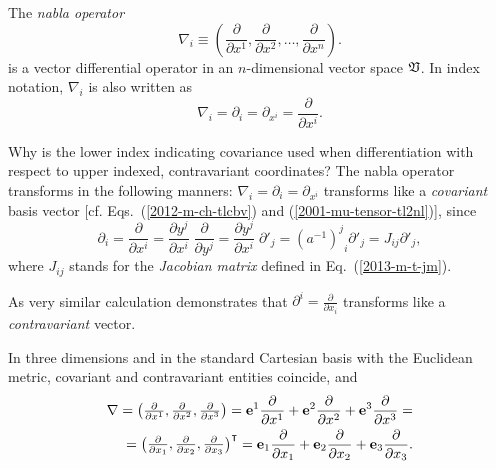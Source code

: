 The {\em nabla operator}
\begin{equation}
\nabla_i \equiv \left(
\frac{\partial }{\partial x^1},
\frac{\partial }{\partial x^2},
\ldots ,
\frac{\partial }{\partial x^n}
\right).
\end{equation}
is a vector differential operator in an $n$-dimensional vector space $\frak V$.
In index notation, $\nabla_i$ is also written as
\begin{equation}
\nabla_i  =\partial_i =\partial_{x^i}
= \frac{\partial }{\partial x^i}
.
\end{equation}

Why is the lower index indicating covariance used when differentiation with respect to upper indexed, contravariant coordinates?
The nabla operator transforms in the following manners:
$\nabla_i  =\partial_i =\partial_{x^i}$ transforms like a {\em covariant} basis vector
[cf. Eqs.~(\ref{2012-m-ch-tlcbv}) and (\ref{2001-mu-tensor-tl2nl})], since
\begin{equation}
\partial_i =
\frac{\partial }{\partial x^i}
=
\frac{\partial { y }^j}{\partial x^i}
\;
\frac{\partial }{\partial { y }^j}
=
\frac{\partial { y }^j}{\partial x^i}
\;
\partial'_j
=
{{(a^{-1})}^j}_i
\partial'_j
=
J_{ij}
\partial'_j,
\end{equation}
where $J_{ij}$ stands for the {\em  Jacobian matrix} defined in Eq.~(\ref{2013-m-t-jm}).

As very similar calculation demonstrates that $\partial^i=\frac{\partial }{\partial x_i}$ transforms like a {\em contravariant} vector.


In three dimensions and in the standard Cartesian basis with the Euclidean metric,
covariant and contravariant entities coincide,
and
\begin{equation}
\begin{split}
\nabla
=
\begin{pmatrix}
\frac{\partial }{\partial x^1},
\frac{\partial }{\partial x^2},
\frac{\partial }{\partial x^3}
\end{pmatrix}
={\bf e}^1\frac{\partial }{\partial x^1}
+{\bf e}^2\frac{\partial }{\partial x^2}
+{\bf e}^3\frac{\partial }{\partial x^3}
=
\\
= \begin{pmatrix}
\frac{\partial }{\partial x_1},
\frac{\partial }{\partial x_2},
\frac{\partial }{\partial x_3}
\end{pmatrix}^\intercal
={\bf e}_1\frac{\partial }{\partial x_1}
+{\bf e}_2\frac{\partial }{\partial x_2}
+{\bf e}_3\frac{\partial }{\partial x_3}
.
\end{split}
\end{equation}

